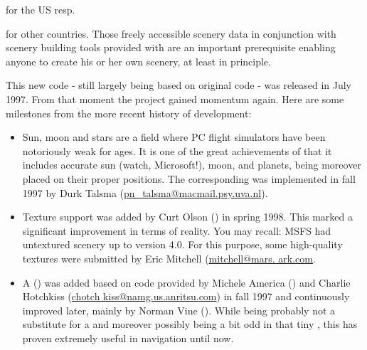 \noindent
 for the US resp.


\noindent
 for other countries. Those freely accessible scenery data in
 conjunction with scenery building tools provided with
 \FlightGear are an important prerequisite enabling anyone to
  create his or her own scenery, at least in principle.

This new \FlightGear code - still largely being based on original  code -
was released in July 1997. From that moment the project gained momentum again. Here are
some milestones from the more recent history of development:

\begin{itemize}

\item Sun, moon and stars are a field where PC flight simulators
 have been notoriously weak for ages. It is one of the great
 achievements of \FlightGear that it includes accurate sun (watch, Microsoft!),
 moon, and planets, being moreover placed on their proper positions.
 The corresponding  was implemented in fall 1997 by Durk
 Talsma
 (\href{mailto:pn_talsma@macmail.psy.uva.nl}{pn\_talsma@macmail.psy.uva.nl}).

\item Texture support was added by Curt
Olson
 () in spring 1998. This marked a
 significant improvement in terms of reality. You may recall: MSFS had
 untextured scenery up to version 4.0. For this purpose, some high-quality
 textures were submitted by Eric Mitchell
 (\href{mailto:mitchell@mars.ark.com}{mitchell@mars. ark.com}.

\item A  () was added based on code
 provided by Michele America
 () and
 Charlie Hotch\-kiss
(\href{mailto:chotchkiss@namg.us.anritsu.com}{chotch kiss@namg.us.anritsu.com})
 in fall 1997 and continuously improved later, mainly by Norman Vine
().
 While being probably not a substitute for a  and moreover
 possibly being a bit odd in that tiny , this  has proven
 extremely useful in navigation until now.


\end{itemize}
